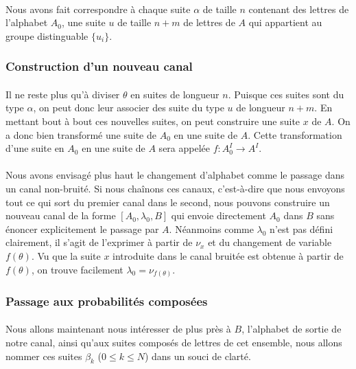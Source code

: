 	\paragraph{}
	Nous avons fait correspondre à chaque suite $\alpha$ de taille $n$ 
	contenant des lettres de l'alphabet $A_0$, une suite $u$ de taille
	$n+m$ de lettres de $A$ qui appartient au groupe distinguable $\{u_i\}$. 
	
\subsubsection*{Construction d'un nouveau canal}
	
	\paragraph{}
	Il ne reste plus qu'à diviser $\theta$ en suites de longueur $n$. 
	Puisque ces suites sont du type $\alpha$, on peut donc leur 
	associer des suite du type $u$ de longueur $n+m$. En mettant bout à bout
	ces nouvelles suites, on peut construire une suite $x$ de $A$. 
	On a donc bien transformé une suite de $A_0$ en une suite de $A$. 
	Cette transformation d'une suite en $A_0$ en une suite de $A$ sera 
	appelée $f : A_0^I \to A^I$.
	
	\paragraph{}
	Nous avons envisagé plus haut le changement
	d'alphabet comme le passage dans un canal non-bruité. Si nous chaînons 
	ces canaux, c'est-à-dire que nous envoyons tout ce qui sort du premier 
	canal dans le second, nous pouvons construire un nouveau canal de la 
	forme $[A_0,\lambda_0,B]$ qui envoie directement $A_0$ dans $B$ 
	sans énoncer explicitement le passage par $A$. Néanmoins comme
	$\lambda_0$ n'est pas défini clairement, il s'agit de l'exprimer à partir 
	de $\nu_x$ et du changement de variable $f(\theta)$. 
	Vu que la suite $x$ introduite dans le canal bruitée est obtenue à 
	partir de $f(\theta)$, on trouve facilement $\lambda_0=\nu_{f(\theta)}$.
	
\subsubsection*{Passage aux probabilités composées}
	
	\paragraph{}
	Nous allons maintenant nous intéresser de plus près à $B$, l'alphabet 
	de sortie de notre canal, ainsi qu'aux suites composés de lettres de cet
	ensemble, nous allons nommer ces suites $\beta_k$ ($0 \le k \le N$) dans
	un souci de clarté.
	

